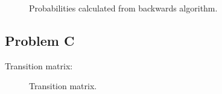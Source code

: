 \documentclass[12pt]{article} %
\begin{document}
\begin{figure}[H]
	\vspace{-10mm}
	\caption{Probabilities calculated from backwards algorithm.}
\end{figure}

\subsection{Problem C}
Transition matrix:
\begin{figure}[H]
	\vspace{-10mm}
	\caption{Transition matrix.}
\end{figure}
\end{document}
